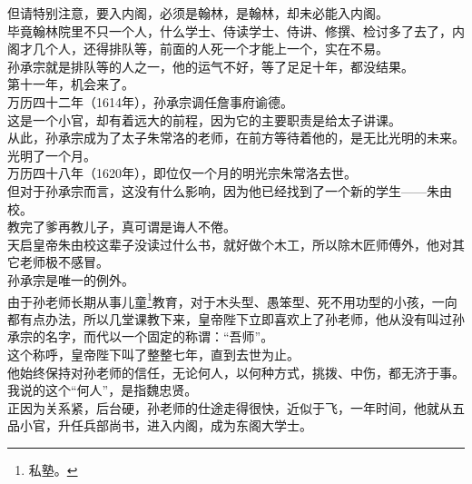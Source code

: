 \begin{multicols}{\theparacolNo}
但请特别注意，要入内阁，必须是翰林，是翰林，却未必能入内阁。\\

毕竟翰林院里不只一个人，什么学士、侍读学士、侍讲、修撰、检讨多了去了，内阁才几个人，还得排队等，前面的人死一个才能上一个，实在不易。\\

孙承宗就是排队等的人之一，他的运气不好，等了足足十年，都没结果。\\

第十一年，机会来了。\\

万历四十二年（1614年），孙承宗调任詹事府谕德。\\

这是一个小官，却有着远大的前程，因为它的主要职责是给太子讲课。\\

从此，孙承宗成为了太子朱常洛的老师，在前方等待着他的，是无比光明的未来。\\

光明了一个月。\\

万历四十八年（1620年），即位仅一个月的明光宗朱常洛去世。\\

但对于孙承宗而言，这没有什么影响，因为他已经找到了一个新的学生——朱由校。\\

教完了爹再教儿子，真可谓是诲人不倦。\\

天启皇帝朱由校这辈子没读过什么书，就好做个木工，所以除木匠师傅外，他对其它老师极不感冒。\\

孙承宗是唯一的例外。\\

由于孙老师长期从事儿童\footnote{私塾。}教育，对于木头型、愚笨型、死不用功型的小孩，一向都有点办法，所以几堂课教下来，皇帝陛下立即喜欢上了孙老师，他从没有叫过孙承宗的名字，而代以一个固定的称谓：“吾师”。\\

这个称呼，皇帝陛下叫了整整七年，直到去世为止。\\

他始终保持对孙老师的信任，无论何人，以何种方式，挑拨、中伤，都无济于事。\\

我说的这个“何人”，是指魏忠贤。\\

正因为关系紧，后台硬，孙老师的仕途走得很快，近似于飞，一年时间，他就从五品小官，升任兵部尚书，进入内阁，成为东阁大学士。\\


\end{multicols}
